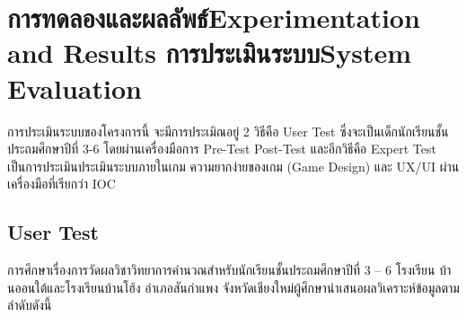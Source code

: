 \chapter{\ifproject%
\ifcpe การทดลองและผลลัพธ์\else Experimentation and Results\fi
\else%
\ifcpe การประเมินระบบ\else System Evaluation\fi
\fi}

การประเมินระบบของโครงการนี้ จะมีการประเมิณอยู่ 2 วิธีคือ User Test ซึ่งจะเป็นเด็กนักเรียนชั้นประถมศึกษาปีที่ 3-6 โดยผ่านเครื่องมือการ Pre-Test
Post-Test และอีกวิธีคือ Expert Test เป็นการประเมินประเมินระบบภายในเกม ความยากง่ายของเกม (Game Design) และ UX/UI ผ่าน
เครื่องมือที่เรียกว่า IOC

\section{User Test}
การศึกษาเรื่องการวัดผลวิชาวิทยาการคำนวณสำหรับนักเรียนชั้นประถมศึกษาปีที่ 3 – 6 โรงเรียน บ้านออนใต้และโรงเรียนบ้านโฮ้ง อำเภอสันกำแพง จังหวัดเชียงใหม่ผู้ศึกษานำเสนอผลวิเคราะห์ข้อมูลตามลำดับดังนี้
